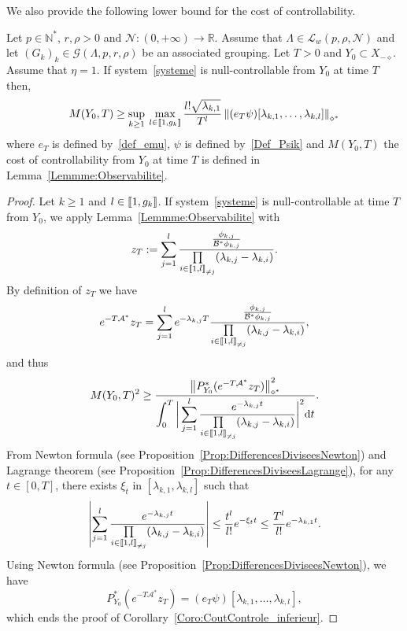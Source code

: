 \documentclass[AHL,Unicode,longabstracts]{cedram}
\newcommand{\llbracket}{\mathopen{[\mkern -2.7mu[}}
\newcommand{\rrbracket}{\mathclose{]\mkern -2.7mu]}}
\newcommand{\inter}[2]{\llbracket #1,#2 \rrbracket}
\newcommand{\interexclu}[3]{\llbracket #1,#2\rrbracket_{\neq #3}}
\newcommand\As{\mathcal{A}^*}
\newcommand\Bs{\mathcal{B}^*}
\newcommand{\Xmalpha}{X_{-\diamond}}
\newcommand{\Fzp}{Y_0}
\newcommand{\normeXalphas}[1]{\left\| #1 \right\|_{\diamond^*}}
\newcommand{\PFa}{P_{\Fzp}^*}
\newcommand{\n}{g}
\newcommand{\LL}{\mathcal{L}}
\newcommand{\NN}{\mathcal{N}}
\newcommand{\N}{\mathbb{N}}
\newcommand{\R}{\mathbb{R}}
\begin{document}
We also provide the following lower bound for the cost of controllability.
\begin{coro} \label{Coro:CoutControle_inferieur}
Let $p \in \N^*$, $r, \rho > 0$ and $\NN : (0,+\infty) \to \R$. Assume that $\Lambda \in \LL_w(p,\rho, \NN)$ and let $(G_k)_k\in \mathcal{G}(\Lambda,p,r,\rho)$ be an associated grouping. Let $T>0$ and $\Fzp \subset \Xmalpha$. Assume that $\eta=1$. If system~\eqref{systeme} is null-controllable from $\Fzp$ at time $T$ then,
\[
M(\Fzp,T) \geq \sup\limits_{k \geq 1} \: \max\limits_{l \in \inter{1}{\n_k}}
\frac{l! \sqrt{\lambda_{k,1}}}{T^l} \normeXalphas{ (e_T \psi) [\lambda_{k,1}, \dots, \lambda_{k,l}] }
\]
where $e_T$ is defined by~\eqref{def_emu}, $\psi$ is defined by~\eqref{Def_Psik} and $M(\Fzp,T)$ the cost of controllability from $\Fzp$ at time $T$ is defined in Lemma~\ref{Lemmme:Observabilite}.
\end{coro}


\begin{proof}
Let $k\geq1$ and $l \in \inter{1}{\n_k}$. If system~\eqref{systeme} is null-controllable at time $T$ from $\Fzp$, we apply Lemma~\ref{Lemmme:Observabilite} with
\[
z_T:=\sum_{j=1}^{l} \frac{ \frac{\phi_{k,j}}{\Bs \phi_{k,j}} }{\prod\limits_{i\in \interexclu{1}{l}{j}} (\lambda_{k,j}-\lambda_{k,i})}.
\]
By definition of $z_T$ we have
\[
e^{-T \As} z_T = \sum_{j=1}^{l} e^{-\lambda_{k,j} T} \frac{ \frac{\phi_{k,j}}{\Bs \phi_{k,j}} }{\prod\limits_{i\in \interexclu{1}{l}{j}} (\lambda_{k,j}-\lambda_{k,i})},
\]
and thus
\begin{equation*}
M(\Fzp, T)^2 \geq \dfrac{\normeXalphas{ \PFa (e^{-T\As} z_T) }^2}{\displaystyle\int_0^T \bigg| \sum_{j=1}^{l} \frac{e^{-\lambda_{k,j} t}}{\prod\limits_{i\in \interexclu{1}{l}{j}} (\lambda_{k,j}-\lambda_{k,i})} \bigg|^2 \mathrm{d}t}.
\end{equation*}
From Newton formula (see Proposition~\ref{Prop:DifferencesDiviseesNewton}) and Lagrange theorem (see Proposition~\ref{Prop:DifferencesDiviseesLagrange}), for any $t \in [0,T]$, there exists $\xi_{t}$ in $[\lambda_{k,1}, \lambda_{k,l}]$ such that
\[
\left| \sum_{j=1}^{l} \frac{e^{-\lambda_{k,j} t}}{\prod\limits_{i\in \interexclu{1}{l}{j}} (\lambda_{k,j}-\lambda_{k,i})} \right|
\leq \frac{t^{l}}{l!} e^{-\xi_{t} t} \leq \frac{T^{l}}{l!} e^{-\lambda_{k,1} t}.
\]
Using Newton formula (see Proposition~\ref{Prop:DifferencesDiviseesNewton}), we have
\[
\PFa (e^{-T\As} z_T) = (e_T \psi) [\lambda_{k,1}, \dots, \lambda_{k,l}],
\]
which ends the proof of Corollary~\ref{Coro:CoutControle_inferieur}.
\end{proof}
\end{document}
